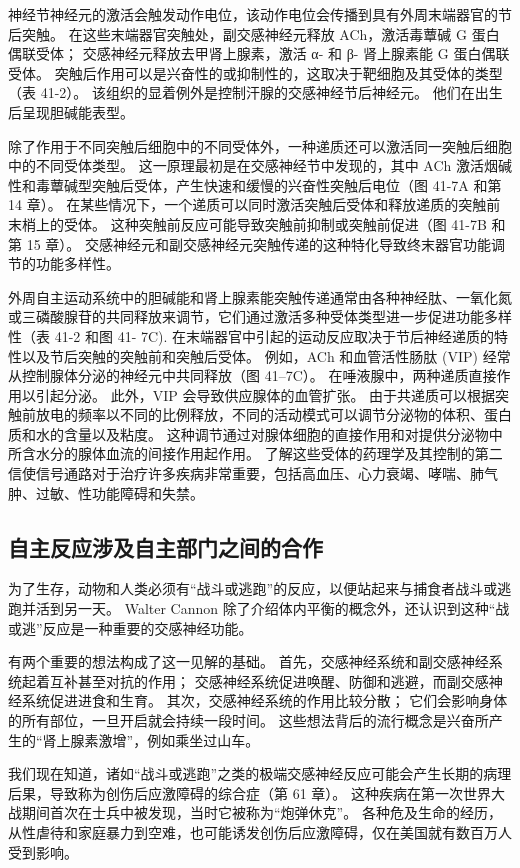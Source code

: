 神经节神经元的激活会触发动作电位，该动作电位会传播到具有外周末端器官的节后突触。 在这些末端器官突触处，副交感神经元释放 ACh，激活毒蕈碱 G 蛋白偶联受体； 交感神经元释放去甲肾上腺素，激活 α- 和 β- 肾上腺素能 G 蛋白偶联受体。 突触后作用可以是兴奋性的或抑制性的，这取决于靶细胞及其受体的类型（表 41-2）。 该组织的显着例外是控制汗腺的交感神经节后神经元。 他们在出生后呈现胆碱能表型。

除了作用于不同突触后细胞中的不同受体外，一种递质还可以激活同一突触后细胞中的不同受体类型。 这一原理最初是在交感神经节中发现的，其中 ACh 激活烟碱性和毒蕈碱型突触后受体，产生快速和缓慢的兴奋性突触后电位（图 41-7A 和第 14 章）。 在某些情况下，一个递质可以同时激活突触后受体和释放递质的突触前末梢上的受体。 这种突触前反应可能导致突触前抑制或突触前促进（图 41-7B 和第 15 章）。 交感神经元和副交感神经元突触传递的这种特化导致终末器官功能调节的功能多样性。

外周自主运动系统中的胆碱能和肾上腺素能突触传递通常由各种神经肽、一氧化氮或三磷酸腺苷的共同释放来调节，它们通过激活多种受体类型进一步促进功能多样性（表 41-2 和图 41- 7C). 在末端器官中引起的运动反应取决于节后神经递质的特性以及节后突触的突触前和突触后受体。 例如，ACh 和血管活性肠肽 (VIP) 经常从控制腺体分泌的神经元中共同释放（图 41–7C）。 在唾液腺中，两种递质直接作用以引起分泌。 此外，VIP 会导致供应腺体的血管扩张。 由于共递质可以根据突触前放电的频率以不同的比例释放，不同的活动模式可以调节分泌物的体积、蛋白质和水的含量以及粘度。 这种调节通过对腺体细胞的直接作用和对提供分泌物中所含水分的腺体血流的间接作用起作用。 了解这些受体的药理学及其控制的第二信使信号通路对于治疗许多疾病非常重要，包括高血压、心力衰竭、哮喘、肺气肿、过敏、性功能障碍和失禁。

\subsection{自主反应涉及自主部门之间的合作}

为了生存，动物和人类必须有“战斗或逃跑”的反应，以便站起来与捕食者战斗或逃跑并活到另一天。 Walter Cannon 除了介绍体内平衡的概念外，还认识到这种“战或逃”反应是一种重要的交感神经功能。

有两个重要的想法构成了这一见解的基础。 首先，交感神经系统和副交感神经系统起着互补甚至对抗的作用； 交感神经系统促进唤醒、防御和逃避，而副交感神经系统促进进食和生育。 其次，交感神经系统的作用比较分散； 它们会影响身体的所有部位，一旦开启就会持续一段时间。 这些想法背后的流行概念是兴奋所产生的“肾上腺素激增”，例如乘坐过山车。

我们现在知道，诸如“战斗或逃跑”之类的极端交感神经反应可能会产生长期的病理后果，导致称为创伤后应激障碍的综合症（第 61 章）。 这种疾病在第一次世界大战期间首次在士兵中被发现，当时它被称为“炮弹休克”。 各种危及生命的经历，从性虐待和家庭暴力到空难，也可能诱发创伤后应激障碍，仅在美国就有数百万人受到影响。

